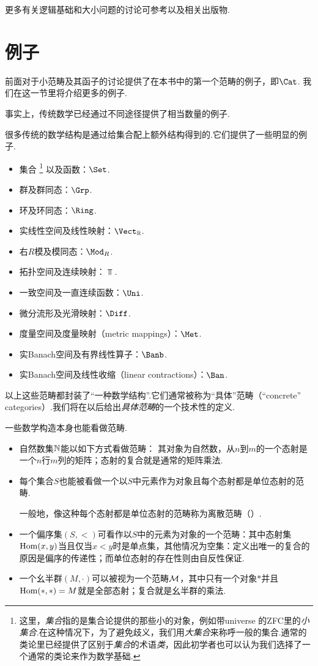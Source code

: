     更多有关逻辑基础和大小问题的讨论可参考\nlab 以及相关出版物.

\section{例子}
  前面对于小范畴及其函子的讨论提供了在本书中的第一个范畴的例子，即$\Cat$.
  我们在这一节里将介绍更多的例子.

  事实上，传统数学已经通过不同途径提供了相当数量的例子.
  \begin{exam}
    很多传统的数学结构是通过给集合配上额外结构得到的.它们提供了一些明显的例子.
    \begin{itemize}
      \item 集合
      \footnote{这里，\emph{集合}指的是集合论提供的那些小的对象，例如带universe 的ZFC里的\emph{小集合}.在这种情况下，为了避免歧义，我们用\emph{大集合}来称呼一般的集合.通常的类论里已经提供了区别于\emph{集合}的术语\emph{类}，因此初学者也可以认为我们选择了一个通常的类论来作为数学基础.}
       以及函数：$\Set$.
      \item 群及群同态：$\Grp$.
      \item 环及环同态：$\Ring$.
      \item 实线性空间及线性映射：$\Vect_{\RR}$.
      \item 右$R$模及模同态：$\Mod_R$.
      \item 拓扑空间及连续映射：$\Top$.
      \item 一致空间及一直连续函数：$\Uni$.
      \item 微分流形及光滑映射：$\Diff$.
      \item 度量空间及度量映射（metric mappings）：$\Met$.
      \item 实Banach空间及有界线性算子：$\Banb$.
      \item 实Banach空间及线性收缩（linear contractions）：$\Ban$.
    \end{itemize}
    以上这些范畴都封装了“一种数学结构”.它们通常被称为“具体”范畴（``concrete'' categories）.我们将在以后给出\emph{具体范畴}的一个技术性的定义.
  \end{exam}
  \begin{exam}
    一些数学构造本身也能看做范畴.
    \begin{itemize}
      \item 自然数集$\operatorname{\mathbb{N}}$能以如下方式看做范畴：
                 其对象为自然数，从$n$到$m$的一个态射是一个$n$行$m$列的矩阵；态射的复合就是通常的矩阵乘法.
      \item 每个集合$S$也能被看做一个以$S$中元素作为对象且每个态射都是单位态射的范畴.

                 一般地，像这种每个态射都是单位态射的范畴称为离散范畴（）.
      \item 一个偏序集$(S,<)$可看作以$S$中的元素为对象的一个范畴：其中态射集$\operatorname{Hom}(x,y)$当且仅当$x < y$时是单点集，其他情况为空集：定义出唯一的复合的原因是偏序的传递性；而单位态射的存在性则由自反性保证.
      \item 一个幺半群$(M,\cdot)$可以被视为一个范畴${\cal M}$，其中只有一个对象$\ast$并且$\operatorname{Hom}(\ast,\ast)=M$就是全部态射；复合就是幺半群的乘法.
    \end{itemize}
  \end{exam}

